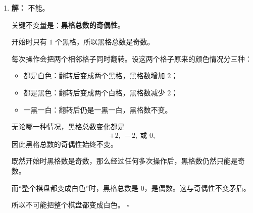 \documentclass[11pt,a4paper,fontset=fandol]{ctexart}
\theoremstyle{formalexample}
\newenvironment{solution}{\par\noindent\textbf{解：}}{\hfill$\square$\par}
\begin{document}
\begin{enumerate}
\begin{solution}
  总共需要
  \[
  6\times 2=12
  \]
  个 $1\times 3$ 长条，恰好把整个棋盘完全覆盖。

  这个题目和上一题放在一起看，能帮助理解：颜色计数常常用来证明“不可能”；而当颜色计数没有矛盾时，还需要自己想办法构造覆盖。
  \end{solution}

  \item \begin{solution}
  不能。

  关键不变量是：\textbf{黑格总数的奇偶性}。

  开始时只有 $1$ 个黑格，所以黑格总数是奇数。

  每次操作会把两个相邻格子同时翻转。设这两个格子原来的颜色情况分三种：
  \begin{itemize}
    \item 都是白色：翻转后变成两个黑格，黑格数增加 $2$；
    \item 都是黑色：翻转后变成两个白格，黑格数减少 $2$；
    \item 一黑一白：翻转后仍是一黑一白，黑格数不变。
  \end{itemize}

  无论哪一种情况，黑格总数变化都是
  \[
  +2,\ -2,\ \text{或 }0,
  \]
  因此黑格总数的奇偶性始终不变。

  既然开始时黑格数是奇数，那么经过任何多次操作后，黑格数仍然只能是奇数。

  而“整个棋盘都变成白色”时，黑格总数是 $0$，是偶数。这与奇偶性不变矛盾。

  所以不可能把整个棋盘都变成白色。
  \end{solution}
\end{enumerate}
\end{document}
